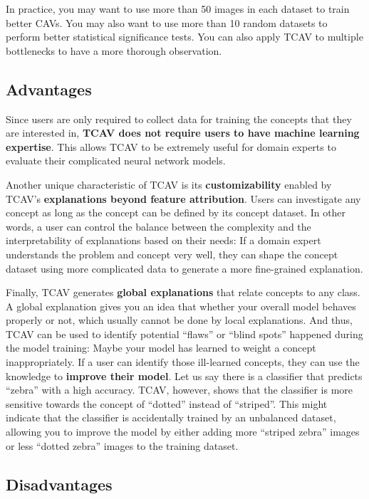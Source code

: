 \documentclass[
  11pt,
]{scrbook}
\begin{document}
In practice, you may want to use more than 50 images in each dataset to train better CAVs.
You may also want to use more than 10 random datasets to perform better statistical significance tests.
You can also apply TCAV to multiple bottlenecks to have a more thorough observation.

\hypertarget{advantages-20}{%
\subsection{Advantages}\label{advantages-20}}

Since users are only required to collect data for training the concepts that they are interested in, \textbf{TCAV does not require users to have machine learning expertise}.
This allows TCAV to be extremely useful for domain experts to evaluate their complicated neural network models.

Another unique characteristic of TCAV is its \textbf{customizability} enabled by TCAV's \textbf{explanations beyond feature attribution}.
Users can investigate any concept as long as the concept can be defined by its concept dataset.
In other words, a user can control the balance between the complexity and the interpretability of explanations based on their needs: If a domain expert understands the problem and concept very well, they can shape the concept dataset using more complicated data to generate a more fine-grained explanation.

Finally, TCAV generates \textbf{global explanations} that relate concepts to any class.
A global explanation gives you an idea that whether your overall model behaves properly or not, which usually cannot be done by local explanations.
And thus, TCAV can be used to identify potential ``flaws'' or ``blind spots'' happened during the model training: Maybe your model has learned to weight a concept inappropriately.
If a user can identify those ill-learned concepts, they can use the knowledge to \textbf{improve their model}.
Let us say there is a classifier that predicts ``zebra'' with a high accuracy. TCAV, however, shows that the classifier is more sensitive towards the concept of ``dotted'' instead of ``striped''.
This might indicate that the classifier is accidentally trained by an unbalanced dataset, allowing you to improve the model by either adding more ``striped zebra'' images or less ``dotted zebra'' images to the training dataset.

\hypertarget{disadvantages-20}{%
\subsection{Disadvantages}\label{disadvantages-20}}
\end{document}

